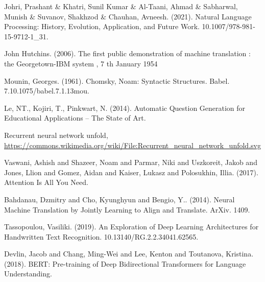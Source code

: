 \documentclass[12pt,a4paper]{report}
\begin{document}


\newpage

\pagestyle{empty}



\cleardoublepage
{}
\tableofcontents
\cleardoublepage
{}

\newpage

\pagestyle{fancy}









\begin{thebibliography}{100}
 Johri, Prashant \& Khatri, Sunil Kumar \& Al-Taani, Ahmad \& Sabharwal, Munish \& Suvanov, Shakhzod \& Chauhan, Avneesh. (2021). Natural Language Processing: History, Evolution, Application, and Future Work. 10.1007/978-981-15-9712-1\_31.

 John Hutchins. (2006). The first public demonstration of machine translation : the Georgetown-IBM system , 7 th January 1954

 Mounin, Georges. (1961). Chomsky, Noam: Syntactic Structures. Babel. 7.10.1075/babel.7.1.13mou.

 Le, NT., Kojiri, T., Pinkwart, N. (2014). Automatic Question Generation for Educational Applications – The State of Art.

 Recurrent neural network unfold, \url{https://commons.wikimedia.org/wiki/File:Recurrent\_neural\_network\_unfold.svg}

 Vaswani, Ashish and Shazeer, Noam and Parmar, Niki and Uszkoreit, Jakob and Jones, Llion and Gomez, Aidan and Kaiser, Lukasz and Polosukhin, Illia. (2017). Attention Is All You Need.

 Bahdanau, Dzmitry and Cho, Kyunghyun and Bengio, Y.. (2014). Neural Machine Translation by Jointly Learning to Align and Translate. ArXiv. 1409.

 Tassopoulou, Vasiliki. (2019). An Exploration of Deep Learning Architectures for Handwritten Text Recognition. 10.13140/RG.2.2.34041.62565.

 Devlin, Jacob and Chang, Ming-Wei and Lee, Kenton and Toutanova, Kristina. (2018). BERT: Pre-training of Deep Bidirectional Transformers for Language Understanding.


\end{thebibliography}
\end{document}
